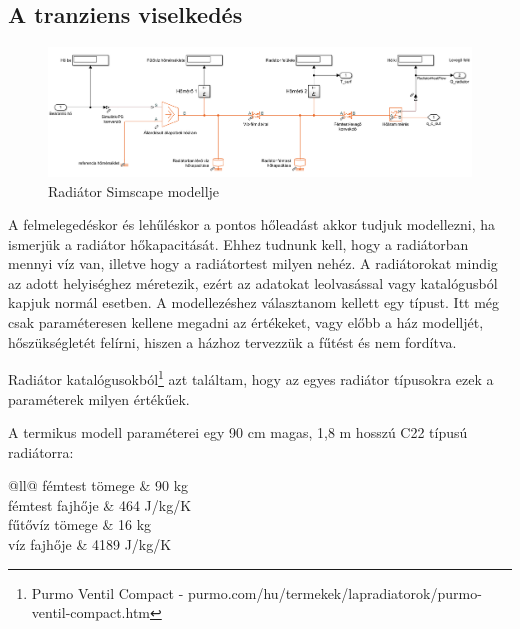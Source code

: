 \subsection{A tranziens viselkedés}
\begin{figure}[H]
	\centering
	\includegraphics[trim=0 0 0 0, clip,width=\textwidth]{figures/simscape/radiator}
	\caption{Radiátor Simscape modellje}
	\label{fig:SimscapeRadiator}
\end{figure}

A felmelegedéskor és lehűléskor a pontos hőleadást akkor tudjuk modellezni, ha ismerjük a radiátor hőkapacitását. Ehhez tudnunk kell, hogy a radiátorban mennyi víz van, illetve hogy a radiátortest milyen nehéz.
A radiátorokat mindig az adott helyiséghez méretezik, ezért az adatokat leolvasással vagy katalógusból kapjuk normál esetben. A modellezéshez választanom kellett egy típust. Itt még csak paraméteresen kellene megadni az értékeket, vagy előbb a ház modelljét, hőszükségletét felírni, hiszen a házhoz tervezzük a fűtést és nem fordítva.

Radiátor katalógusokból\footnote{Purmo Ventil Compact - purmo.com/hu/termekek/lapradiatorok/purmo-ventil-compact.htm} azt találtam, hogy az egyes radiátor típusokra ezek a paraméterek milyen értékűek.

A termikus modell paraméterei egy 90 cm magas, 1,8 m hosszú C22 típusú radiátorra:

\begin{table}[H]
	\footnotesize
	\centering
	\caption{Radiátor adatai a tranziensekhez}
	\begin{tabu}{@{}ll@{}}
		\hline
		fémtest tömege 	& 90 \si[per-mode=symbol]{\kilogram}
		\\
		fémtest fajhője	& 464 \si[per-mode=symbol]{\joule\per\kilogram\per\kelvin}
		\\
		fűtővíz tömege	& 16 \si[per-mode=symbol]{\kilogram}
		\\
		víz fajhője		& 4189 \si[per-mode=symbol]{\joule\per\kilogram\per\kelvin}
		\\ \hline
	\end{tabu}
	\label{tab:RadiatorHeatCap}
\end{table}


